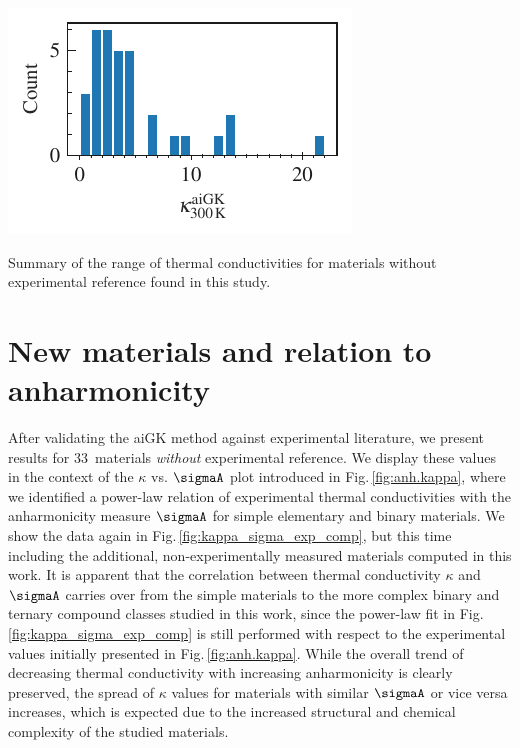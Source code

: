 \begin{marginfigure}
	\includegraphics[width=\textwidth]{./data/plots/kappa_histogram/histogram.pdf}
	\caption{Summary of the range of thermal conductivities for materials without experimental reference found in this study.}
	\label{fig:kappa_wo_exp_hist}
\end{marginfigure}


\section{New materials and relation to anharmonicity}
\label{sec:results.new}
After validating the aiGK method against experimental literature, we present results for 33~materials \emph{without} experimental reference. We display these values in the context of the $\kappa$ vs. $\sigmaA$ plot introduced in Fig.\,\ref{fig:anh.kappa}, where we identified a power-law relation of experimental thermal conductivities with the anharmonicity measure $\sigmaA$ for simple elementary and binary materials. We show the data again in Fig.\,\ref{fig:kappa_sigma_exp_comp}, but this time including the additional, non-experimentally measured materials computed in this work.
%
It is apparent that the correlation between thermal conductivity $\kappa$ and $\sigmaA$ carries over from the simple materials to the more complex binary and ternary compound classes studied in this work, since the power-law fit in Fig.\,\ref{fig:kappa_sigma_exp_comp} is still performed with respect to the experimental values initially presented in Fig.\,\ref{fig:anh.kappa}. While the overall trend of decreasing thermal conductivity with increasing anharmonicity is clearly preserved, the spread of $\kappa$ values for materials with similar $\sigmaA$ or vice versa increases, which is expected due to the increased structural and chemical complexity of the studied materials.

